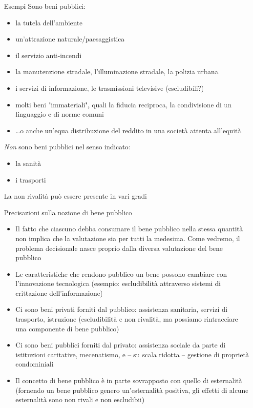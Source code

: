 \documentclass[aspectratio=149,11pt]{beamer}
\begin{document}
\begin{frame}{Esempi}
Sono beni pubblici:
\begin{itemize}
\item la tutela dell'ambiente
\item un'attrazione naturale/paesaggistica
\item il servizio anti-incendi
\item la manutenzione stradale, l'illuminazione stradale, la polizia urbana
\item i servizi di informazione, le trasmissioni televisive (escludibili?)
\item molti beni "immateriali", quali la fiducia reciproca, la condivisione di un linguaggio e di norme comuni
\item \ldots{}o anche un'equa distribuzione del reddito in una società attenta all'equità
\end{itemize}
\emph{Non} sono beni pubblici nel senso indicato:
\begin{itemize}
\item la sanità
\item i trasporti
\end{itemize}
La non rivalità può essere presente in vari gradi
\end{frame}


\begin{frame}{Precisazioni sulla nozione di bene pubblico}
\begin{itemize}
\item Il fatto che ciascuno debba consumare il bene pubblico nella stessa quantità non implica che la valutazione sia per tutti la medesima. Come vedremo, il problema decisionale nasce proprio dalla diversa valutazione del bene pubblico
\item Le caratteristiche che rendono pubblico un bene possono cambiare con l'innovazione tecnologica (esempio: escludibilità attraverso sistemi di crittazione dell'informazione)
\item Ci sono beni privati forniti dal pubblico: assistenza sanitaria, servizi di trasporto, istruzione (escludibilità e non rivalità, ma possiamo rintracciare una componente di bene pubblico)
\item Ci sono beni pubblici forniti dal privato: assistenza sociale da parte di istituzioni caritative, mecenatismo, e -- su scala ridotta -- gestione di proprietà condominiali
\item Il concetto di bene pubblico è in parte sovrapposto con quello di esternalità (fornendo un bene pubblico genero un'esternalità positiva, gli effetti di alcune esternalità sono non rivali e non escludibii)
\end{itemize}
\end{frame}
\end{document}
